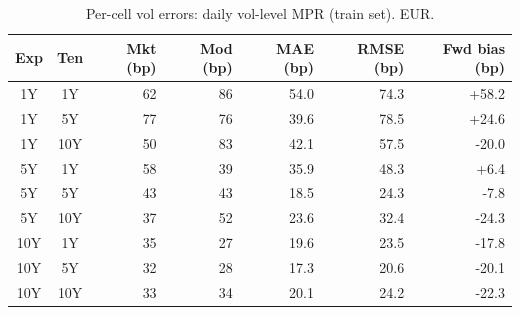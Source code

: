 \begin{table}[H]
\centering
\caption{Per-cell vol errors: daily vol-level MPR (train set). EUR.}
\label{tab:daily_vol_mpr_per_cell_train}
\small
\begin{tabular}{@{}ccrrrrr@{}}
\toprule
\textbf{Exp} & \textbf{Ten} & \textbf{Mkt (bp)} & \textbf{Mod (bp)} & \textbf{MAE (bp)} & \textbf{RMSE (bp)} & \textbf{Fwd bias (bp)} \\
\midrule
  1Y & 1Y & 62 & 86 & 54.0 & 74.3 & +58.2 \\
  1Y & 5Y & 77 & 76 & 39.6 & 78.5 & +24.6 \\
  1Y & 10Y & 50 & 83 & 42.1 & 57.5 & -20.0 \\
  \midrule
  5Y & 1Y & 58 & 39 & 35.9 & 48.3 & +6.4 \\
  5Y & 5Y & 43 & 43 & 18.5 & 24.3 & -7.8 \\
  5Y & 10Y & 37 & 52 & 23.6 & 32.4 & -24.3 \\
  \midrule
  10Y & 1Y & 35 & 27 & 19.6 & 23.5 & -17.8 \\
  10Y & 5Y & 32 & 28 & 17.3 & 20.6 & -20.1 \\
  10Y & 10Y & 33 & 34 & 20.1 & 24.2 & -22.3 \\
\bottomrule
\end{tabular}
\end{table}